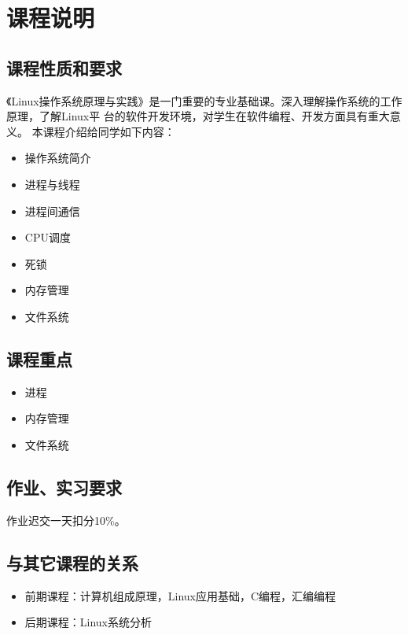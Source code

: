 \documentclass{wx672ctexart}
\begin{document}
\nocite{silberschatz11essentials,tanenbaum2008modern,bovet2005understanding}
\printbibliography[heading=none]{}

\section{课程说明}
\label{sec-2}

\subsection{课程性质和要求}
\label{sec-2-1}

《Linux操作系统原理与实践》是一门重要的专业基础课。深入理解操作系统的工作原理，了解Linux平
台的软件开发环境，对学生在软件编程、开发方面具有重大意义。 本课程介绍给同学如下内容：
\begin{itemize}
\item 操作系统简介
\item 进程与线程
\item 进程间通信
\item CPU调度
\item 死锁
\item 内存管理
\item 文件系统
\end{itemize}

\subsection{课程重点}
\label{sec-2-2}

\begin{itemize}
\item 进程
\item 内存管理
\item 文件系统
\end{itemize}

\subsection{作业、实习要求}
\label{sec-2-3}
作业迟交一天扣分10\%。

\subsection{与其它课程的关系}
\label{sec-2-4}

\begin{itemize}
\item 前期课程：计算机组成原理，Linux应用基础，C编程，汇编编程
\item 后期课程：Linux系统分析
\end{itemize}
\end{document}
